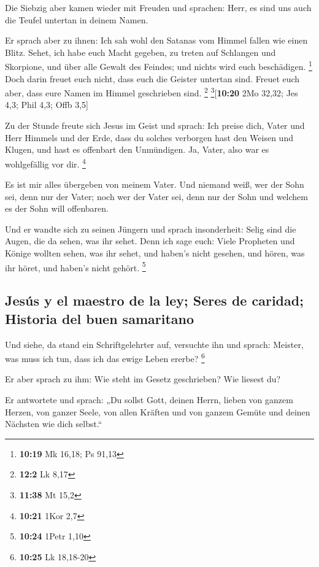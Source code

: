  Die Siebzig aber kamen wieder mit Freuden und sprachen:
Herr, es sind uns auch die Teufel untertan in deinem Namen.

 Er sprach aber zu ihnen: Ich sah wohl den Satanas vom
Himmel fallen wie einen Blitz.  Sehet, ich habe euch
Macht gegeben, zu treten auf Schlangen und Skorpione, und über alle
Gewalt des Feindes; und nichts wird euch beschädigen. \footnote{\textbf{10:19}
  Mk 16,18; Ps 91,13}  Doch darin freuet euch nicht, dass
euch die Geister untertan sind. Freuet euch aber, dass eure Namen im
Himmel geschrieben sind. \footnote{\textbf{12:2} Lk 8,17}
\footnote{\textbf{11:38} Mt 15,2}{[}\textbf{10:20} 2Mo 32,32; Jes 4,3;
Phil 4,3; Offb 3,5{]}

 Zu der Stunde freute sich Jesus im Geist und sprach: Ich
preise dich, Vater und Herr Himmels und der Erde, dass du solches
verborgen hast den Weisen und Klugen, und hast es offenbart den
Unmündigen. Ja, Vater, also war es wohlgefällig vor dir. \footnote{\textbf{10:21}
  1Kor 2,7}

 Es ist mir alles übergeben von meinem Vater. Und niemand
weiß, wer der Sohn sei, denn nur der Vater; noch wer der Vater sei, denn
nur der Sohn und welchem es der Sohn will offenbaren.

 Und er wandte sich zu seinen Jüngern und sprach
insonderheit: Selig sind die Augen, die da sehen, was ihr sehet.
 Denn ich sage euch: Viele Propheten und Könige wollten
sehen, was ihr sehet, und haben's nicht gesehen, und hören, was ihr
höret, und haben's nicht gehört. \footnote{\textbf{10:24} 1Petr 1,10}

\hypertarget{jesuxfas-y-el-maestro-de-la-ley-seres-de-caridad-historia-del-buen-samaritano}{%
\subsection{Jesús y el maestro de la ley; Seres de caridad; Historia del
buen
samaritano}\label{jesuxfas-y-el-maestro-de-la-ley-seres-de-caridad-historia-del-buen-samaritano}}

 Und siehe, da stand ein Schriftgelehrter auf, versuchte
ihn und sprach: Meister, was muss ich tun, dass ich das ewige Leben
ererbe? \footnote{\textbf{10:25} Lk 18,18-20}

 Er aber sprach zu ihm: Wie steht im Gesetz geschrieben?
Wie liesest du?

 Er antwortete und sprach: „Du sollst Gott, deinen Herrn,
lieben von ganzem Herzen, von ganzer Seele, von allen Kräften und von
ganzem Gemüte und deinen Nächsten wie dich selbst.``

